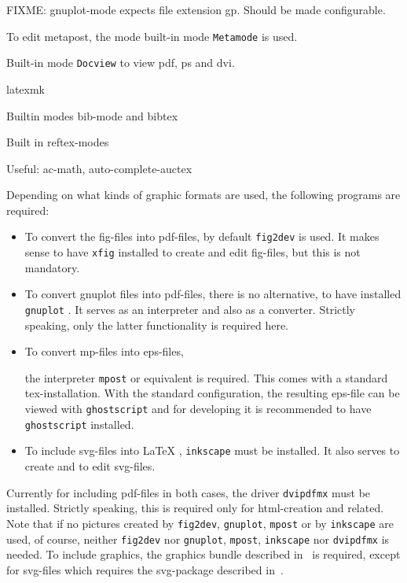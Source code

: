 \documentclass[12pt]{book}
\newcommand{\gls}[1]{#1}
\renewcommand{\index}[1]{ }
\begin{document}
FIXME\@: gnuplot-mode expects file extension gp. 
Should be made configurable. 

To edit metapost, the mode built-in mode \texttt{Metamode} is used. 

Built-in mode \texttt{Docview} to view pdf, ps and dvi. 

latexmk

Builtin modes bib-mode and bibtex

Built in reftex-modes

Useful: 
ac-math, auto-complete-auctex

Depending on what kinds of graphic formats are used, 
the following programs are required: 
%
\begin{itemize}
\item
To convert the \gls{fig}-files into \gls{pdf}-files, 
by default \texttt{fig2dev}\index{fig2dev} is used. 
It makes sense to have \texttt{xfig}\index{xfig} installed 
to create and edit fig-files, but this is not mandatory. 
\item
To convert gnuplot files into pdf-files, there is no alternative, 
to have installed \texttt{gnuplot}\index{gnuplot}. 
It serves as an interpreter and also as a converter. 
Strictly speaking, only the latter functionality is required here. 
\item
To convert \gls{mp}-files into \gls{eps}-files, 
\index{mpost}\index{metapost}
the interpreter \texttt{mpost} or equivalent is required. 
This comes with a standard tex-installation. 
With the standard configuration, 
the resulting eps-file can be viewed with \texttt{ghostscript} 
and for developing it is recommended to have \texttt{ghostscript} installed. 
\item
To include \gls{svg}-files into \LaTeX\index{svg}, 
\texttt{inkscape}\index{inkscape} must be installed. 
It also serves to create and to edit svg-files. 
\end{itemize}



Currently for including pdf-files in both cases, 
the driver \texttt{dvipdfmx} must be installed. 
Strictly speaking, this is required only for html-creation and related. 
Note that if no pictures created by \texttt{fig2dev}, \texttt{gnuplot}, 
\texttt{mpost} or by \texttt{inkscape} are used, of course, 
neither \texttt{fig2dev} nor \texttt{gnuplot}, \texttt{mpost}, \texttt{inkscape} 
nor \texttt{dvipdfmx} is needed. 
To include graphics, the graphics bundle described in~\cite{GraX} is required, 
except for svg-files which requires the svg-package 
described in~\cite{SvgP}. 
\end{document}
